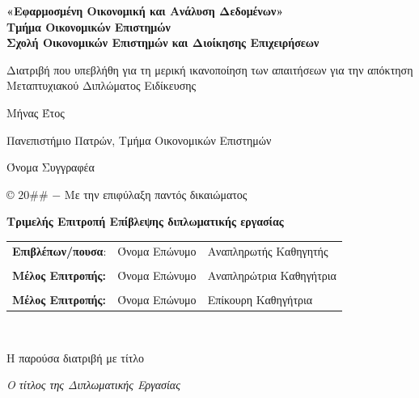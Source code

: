 \documentclass[12pt,a4paper,oneside]{book}
\begin{document}
\begin{titlepage}
\begin{center}
	
	\textbf{\footnotesize «Εφαρμοσμένη Οικονομική και Ανάλυση Δεδομένων» \\
	Τμήμα Οικονομικών Επιστημών \\ 
	Σχολή Οικονομικών Επιστημών και Διοίκησης Επιχειρήσεων } 


\hfill \break
\hfill \break
\bigskip 

{\footnotesize Διατριβή που υπεβλήθη για τη μερική ικανοποίηση των
απαιτήσεων για την απόκτηση Μεταπτυχιακού Διπλώματος Ειδίκευσης}


\hfill \break
\hfill \break
	
	
{Μήνας  Έτος}\\
\end{center}

\end{titlepage}
	





\newpage
\thispagestyle{empty}
Πανεπιστήμιο Πατρών, Τμήμα Οικονομικών Επιστημών

Όνομα Συγγραφέα

{\copyright} $20\#\#$ $-$ Με την επιφύλαξη παντός δικαιώματος


\newpage
\thispagestyle{empty}
\begin{center}
	\textbf{Τριμελής Επιτροπή Επίβλεψης διπλωματικής εργασίας}
\end{center}
\bigskip \bigskip
\begin{tabular}{ l l l }
	\textbf{Επιβλέπων/πουσα}: & Όνομα Επώνυμο  & Αναπληρωτής Καθηγητής\\\\
	\textbf{Μέλος Επιτροπής:}  &  Όνομα Επώνυμο & Αναπληρώτρια Καθηγήτρια\\\\
	\textbf{Μέλος Επιτροπής:}  &  Όνομα Επώνυμο & Επίκουρη Καθηγήτρια
\end{tabular}
\\

\bigskip \bigskip \bigskip \bigskip \bigskip


Η παρούσα διατριβή με τίτλο


\smallskip
\begin{center}
\textit{\guillemotleft Ο τίτλος της Διπλωματικής Εργασίας\guillemotright}
\end{center}

\smallskip
\end{document}
